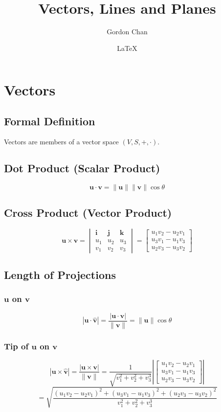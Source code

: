 \documentclass[a4paper]{article}
\title{Vectors, Lines and Planes}
\author{Gordon Chan}
\date{\LaTeX}
\newcommand{\vv}{\mathbf}
\begin{document}
\maketitle

\section{Vectors}

\subsection{Formal Definition}

Vectors are members of a vector space \((V,S,+,\cdot)\).

\subsection{Dot Product (Scalar Product)}

\[\vv u\cdot\vv v=\|\vv u\|\|\vv v\|\cos\theta\]

\subsection{Cross Product (Vector Product)}

\[\vv u\times\vv v=\begin{vmatrix}
    \vv i&\vv j&\vv k\\
    u_1&u_2&u_3\\
    v_1&v_2&v_3
\end{vmatrix}=\begin{bmatrix}
    u_1v_2-u_2v_1\\
    u_3v_1-u_1v_3\\
    u_2v_3-u_3v_2
\end{bmatrix}\]

\subsection{Length of Projections}

\subsubsection{\(\vv u\) on \(\vv v\)}

\[|\vv u\cdot\hat{\vv v}|=\frac{|\vv u\cdot\vv v|}{\|\vv v\|}=\|\vv u\|\cos\theta\]

\subsubsection{Tip of \(\vv u\) on \(\vv v\)}

\[|\vv u\times\hat{\vv v}|=\frac{|\vv u\times\vv v|}{\|\vv v\|}=\frac1{\sqrt{v_1^2+v_2^2+v_3^3}}\left|\begin{bmatrix}
    u_1v_2-u_2v_1\\
    u_3v_1-u_1v_3\\
    u_2v_3-u_3v_2
\end{bmatrix}\right|\]
\[=\sqrt{\frac{(u_1v_2-u_2v_1)^2+(u_3v_1-u_1v_3)^2+(u_2v_3-u_3v_2)^2}{v_1^2+v_2^2+v_3^3}}\]
\end{document}
